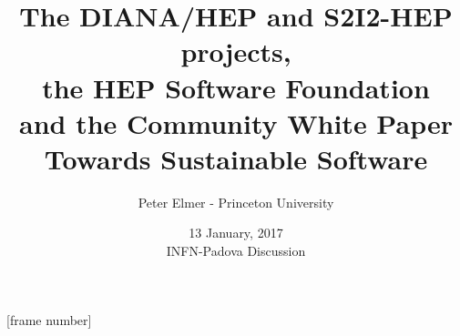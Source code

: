 \documentclass{beamer}
\title{The DIANA/HEP and S2I2-HEP projects, \\
       the HEP Software Foundation \\
       and the Community White Paper \\
       Towards Sustainable Software}
\author{Peter Elmer - Princeton University}
\date{13 January, 2017 \\ INFN-Padova Discussion}
\begin{document}
\maketitle

%
%

[frame number]






























































%
\end{document}

